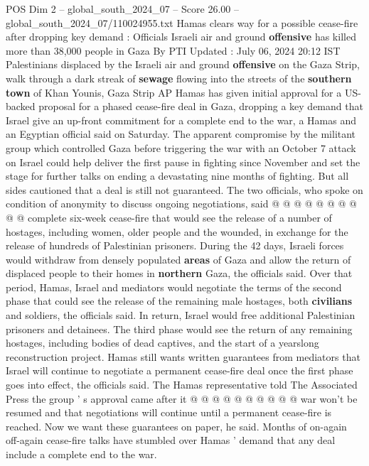 \begin{textsample}{POS Dim 2 – global\_south\_2024\_07 – Score 26.00 – global\_south\_2024\_07/110024955.txt}  \label{ex:f2_pos_166}
Hamas clears way for a possible cease-fire after dropping key demand : Officials Israeli air and ground \textbf{offensive} has killed more than 38,000 people in Gaza By PTI Updated : July 06, 2024 20:12 IST Palestinians displaced by the Israeli air and ground \textbf{offensive} on the Gaza Strip, walk through a dark streak of \textbf{sewage} flowing into the streets of the \textbf{southern} \textbf{town} of Khan Younis, Gaza Strip AP Hamas has given initial approval for a US-backed proposal for a phased cease-fire deal in Gaza, dropping a key demand that Israel give an up-front commitment for a complete end to the war, a Hamas and an Egyptian official said on Saturday.
The apparent compromise by the militant group which controlled Gaza before triggering the war with an October 7 attack on Israel could help deliver the first pause in fighting since November and set the stage for further talks on ending a devastating nine months of fighting.
But all sides cautioned that a deal is still not guaranteed.
The two officials, who spoke on condition of anonymity to discuss ongoing negotiations, said @ @ @ @ @ @ @ @ @ @ complete six-week cease-fire that would see the release of a number of hostages, including women, older people and the wounded, in exchange for the release of hundreds of Palestinian prisoners.
During the 42 days, Israeli forces would withdraw from densely populated \textbf{areas} of Gaza and allow the return of displaced people to their homes in \textbf{northern} Gaza, the officials said.
Over that period, Hamas, Israel and mediators would negotiate the terms of the second phase that could see the release of the remaining male hostages, both \textbf{civilians} and soldiers, the officials said.
In return, Israel would free additional Palestinian prisoners and detainees.
The third phase would see the return of any remaining hostages, including bodies of dead captives, and the start of a yearslong reconstruction project.
Hamas still wants written guarantees from mediators that Israel will continue to negotiate a permanent cease-fire deal once the first phase goes into effect, the officials said.
The Hamas representative told The Associated Press the group ' s approval came after it @ @ @ @ @ @ @ @ @ @ war won't be resumed and that negotiations will continue until a permanent cease-fire is reached.
Now we want these guarantees on paper, he said.
Months of on-again off-again cease-fire talks have stumbled over Hamas ' demand that any deal include a complete end to the war.

\end{textsample}
